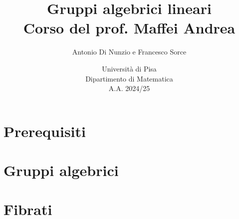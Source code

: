 \documentclass[a4paper]{report}
\title{Gruppi algebrici lineari\\
\large Corso del prof. Maffei Andrea}
\author{Antonio Di Nunzio
 e Francesco Sorce}
\date{Università di Pisa\\
Dipartimento di Matematica\\
A.A. 2024/25}
\begin{document}
\maketitle

\tableofcontents
\newpage


\part{Prerequisiti}


\part{Gruppi algebrici}




\part{Fibrati}


\end{document}
